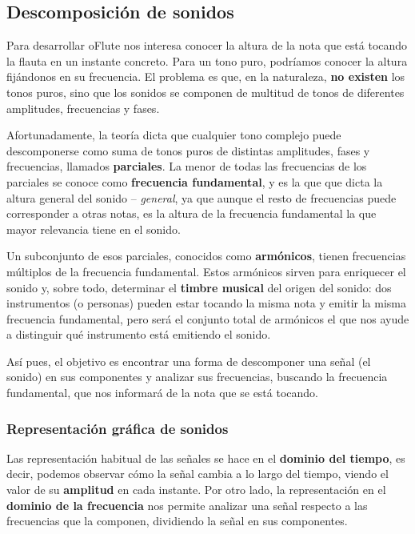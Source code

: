 \subsection{Descomposición de sonidos}
Para desarrollar oFlute nos interesa conocer la altura de la nota que
está tocando la flauta en un instante concreto. Para un tono puro,
podríamos conocer la altura fijándonos en su frecuencia. El problema
es que, en la naturaleza, \textbf{no existen} los tonos puros, sino
que los sonidos se componen de multitud de tonos de diferentes
amplitudes, frecuencias y fases. 

Afortunadamente, la teoría dicta que cualquier tono complejo puede
descomponerse como suma de tonos puros de distintas amplitudes, fases
y frecuencias, llamados \textbf{parciales}. La menor de todas las
frecuencias de los parciales se conoce como \textbf{frecuencia
  fundamental}, y es la que que dicta la altura general del sonido --
\textit{general}, ya que aunque el resto de frecuencias puede
corresponder a otras notas, es la altura de la frecuencia fundamental
la que mayor relevancia tiene en el sonido.

Un subconjunto de esos parciales, conocidos como \textbf{armónicos},
tienen frecuencias múltiplos de la frecuencia fundamental. Estos
armónicos sirven para enriquecer el sonido y, sobre todo, determinar
el \textbf{timbre musical} del origen del sonido: dos instrumentos (o
personas) pueden estar tocando la misma nota y emitir la misma
frecuencia fundamental, pero será el conjunto total de armónicos el
que nos ayude a distinguir qué instrumento está emitiendo el sonido.

Así pues, el objetivo es encontrar una forma de descomponer una señal
(el sonido) en sus componentes y analizar sus frecuencias, buscando la
frecuencia fundamental, que nos informará de la nota que se está tocando. 

\subsubsection{Representación gráfica de sonidos}

Las representación habitual de las señales se hace en el
\textbf{dominio del tiempo}, es decir, podemos observar cómo la señal
cambia a lo largo del tiempo, viendo el valor de su \textbf{amplitud}
en cada instante. Por otro lado, la representación en el
\textbf{dominio de la frecuencia} nos permite analizar una señal
respecto a las frecuencias que la componen, dividiendo la señal en sus
componentes.

